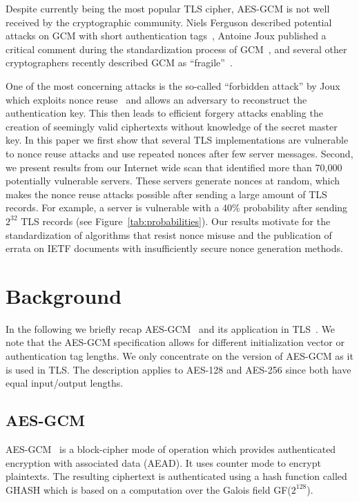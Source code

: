 \documentclass[10pt, a4paper]{article}
\begin{document}
Despite currently being the most popular TLS cipher, AES-GCM is not well received by the cryptographic community. Niels Ferguson described potential
attacks on GCM with short authentication tags~\cite{ferguson2005}, Antoine Joux published a
critical comment during the standardization process of GCM~\cite{joux2007}, and several other cryptographers recently described GCM as ``fragile''~\cite{gcm-kenny,6822219}.

One of the most concerning attacks is the so-called ``forbidden attack'' by Joux which exploits nonce reuse~\cite{joux2007} and allows an adversary to reconstruct the authentication key.
This then leads to efficient forgery attacks enabling the creation of seemingly valid ciphertexts without knowledge of the secret master key.
In this paper we first show that several TLS implementations are vulnerable to nonce reuse attacks and use repeated nonces after few server messages.
Second, we present results from our Internet wide scan that identified more than 70,000 potentially vulnerable servers. 
These servers generate nonces at random, which makes the nonce reuse attacks possible after sending a large amount of TLS records. For example, a server is vulnerable with a 40\% probability after sending $2^{32}$ TLS records (see Figure~\ref{tab:probabilities}).
Our results motivate for the standardization of algorithms that resist nonce misuse and the publication of errata on IETF documents with insufficiently secure nonce generation methods.



\section{Background}
In the following we briefly recap AES-GCM~\cite{gcm,gcm-nist} and its application in TLS~\cite{rfc5246}. We note that the AES-GCM
specification allows for different initialization vector or authentication tag lengths.
We only concentrate on the version of AES-GCM as it is used in TLS.
The description applies to AES-128 and AES-256 since both have equal input/output lengths.

\subsection{AES-GCM}
AES-GCM~\cite{gcm-nist} is a block-cipher mode of operation which provides authenticated encryption with associated data (AEAD). It uses counter mode to encrypt plaintexts. The resulting ciphertext is authenticated using a
hash function called GHASH which is based on a computation over the Galois field GF($2^{128}$).
\end{document}
